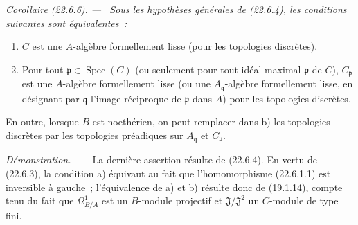 \documentclass[10pt,oneside]{book}
\makeatletter
\newcommand{\setmanualcurrentlabel}[1]{\def\@currentlabel{#1}}
\newenvironment{corollary}[1][]{%
  \setmanualcurrentlabel{#1}\par\medskip\noindent\itshape Corollaire (#1). ---\ }{\par}
\newenvironment{proof}{%
  \par\medskip\noindent\textit{Démonstration. ---\ }}{\par}
\makeatother
\begin{document}
\begin{corollary}[22.6.6]
\label{0.22.6.6-fr}
Sous les hypothèses générales de (22.6.4), les conditions suivantes sont
équivalentes~:
\begin{enumerate}
  \item[a)] $C$ est une $A$-algèbre formellement lisse (pour les topologies
  discrètes).
  \item[b)] Pour tout $\mathfrak p\in\operatorname{Spec}(C)$ (ou seulement pour tout idéal
  maximal $\mathfrak p$ de $C$), $C_{\mathfrak p}$ est une $A$-algèbre
  formellement lisse (ou une $A_{\mathfrak q}$-algèbre formellement lisse, en
  désignant par $\mathfrak q$ l'image réciproque de $\mathfrak p$ dans $A$)
  pour les topologies discrètes.
\end{enumerate}
En outre, lorsque $B$ est noethérien, on peut remplacer dans b) les topologies
discrètes par les topologies préadiques sur $A_{\mathfrak q}$ et
$C_{\mathfrak p}$.
\end{corollary}

\begin{proof}
La dernière assertion résulte de (22.6.4). En vertu de (22.6.3), la condition
a) équivaut au fait que l'homomorphisme (22.6.1.1) est inversible à gauche~;
l'équivalence de a) et b) résulte donc de (19.1.14), compte tenu du fait que
$\Omega^1_{B/A}$ est un $B$-module projectif et $\mathfrak J/\mathfrak J^2$
un $C$-module de type fini.
\end{proof}
\end{document}
